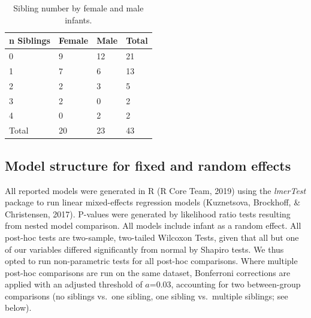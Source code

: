 \documentclass[
  english,
  man,floatsintext]{apa6}
\begin{document}
\begin{table}[H]

\begin{center}
\begin{threeparttable}

\caption{\label{tab:table-sibling-number}Sibling number by female and male infants.}

\small{

\begin{tabular}{llll}
\toprule
n Siblings & \multicolumn{1}{c}{Female} & \multicolumn{1}{c}{Male} & \multicolumn{1}{c}{Total}\\
\midrule
0 & 9 & 12 & 21\\
1 & 7 & 6 & 13\\
2 & 2 & 3 & 5\\
3 & 2 & 0 & 2\\
4 & 0 & 2 & 2\\
Total & 20 & 23 & 43\\
\bottomrule
\end{tabular}

}

\end{threeparttable}
\end{center}

\end{table}

\hypertarget{model-structure-for-fixed-and-random-effects}{%
\subsection{Model structure for fixed and random effects}\label{model-structure-for-fixed-and-random-effects}}

All reported models were generated in R (R Core Team, 2019) using the \emph{lmerTest} package to run linear mixed-effects regression models (Kuznetsova, Brockhoff, \& Christensen, 2017). P-values were generated by likelihood ratio tests resulting from nested model comparison. All models include infant as a random effect. All post-hoc tests are two-sample, two-tailed Wilcoxon Tests, given that all but one of our variables differed significantly from normal by Shapiro tests. We thus opted to run non-parametric tests for all post-hoc comparisons. Where multiple post-hoc comparisons are run on the same dataset, Bonferroni corrections are applied with an adjusted threshold of \(a\)=0.03, accounting for two between-group comparisons (no siblings vs.~one sibling, one sibling vs.~multiple siblings; see below).
\end{document}
